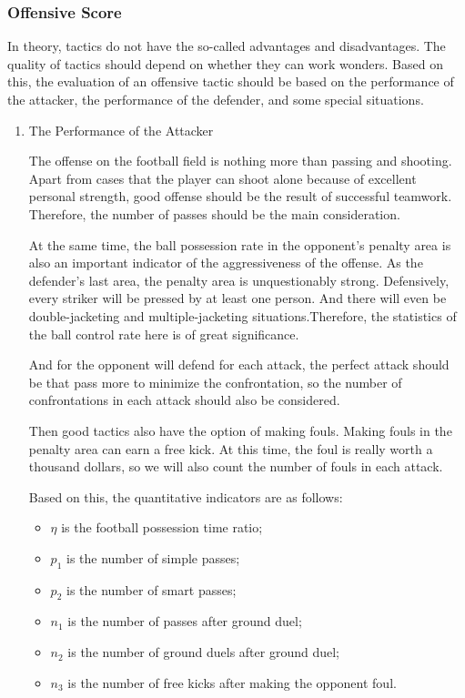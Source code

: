 \documentclass{mcmthesis}
\begin{document}
\subsubsection{Offensive Score}
	In theory, tactics do not have the so-called advantages and disadvantages. The quality of tactics should depend on whether they can work wonders.  Based on this, the evaluation of an offensive tactic should be based on the performance of the attacker, the performance of the defender, and some special situations.
	\begin{enumerate}
	\item The Performance of the Attacker
	
	\qquad The offense on the football field is nothing more than passing and shooting. Apart from cases that the player can shoot alone because of excellent personal strength, good offense should be the result of successful teamwork.  Therefore, the number of passes should be the main consideration.

	\qquad At the same time, the ball possession rate in the opponent's penalty area is also an important indicator of the aggressiveness of the offense. As the defender's last area, the penalty area is unquestionably strong.  Defensively, every striker will be pressed by at least one person.  And there will even be double-jacketing and multiple-jacketing situations.Therefore, the statistics of the ball control rate here is of great significance. 

	\qquad And for the opponent will defend for each attack, the perfect attack should be that pass more to minimize the confrontation, so the number of confrontations in each attack should also be considered.  

	\qquad Then good tactics also have the option of making fouls. Making fouls in the penalty area can earn a free kick. At this time, the foul is really worth a thousand dollars, so we will also count the number of fouls in each attack.
	
	\qquad Based on this, the quantitative indicators are as follows:
	
	\begin{itemize}
		\item $\eta$ is the football possession time ratio;
		\item $p_{1}$ is the number of simple passes;
		\item $p_{2}$ is the number of smart passes;
		\item $n_{1}$ is the number of passes after ground duel;
		\item $n_{2}$ is the number of ground duels after ground duel;
		\item $n_{3}$ is the number of free kicks after making the opponent foul.
	\end{itemize}


\end{enumerate}
\end{document}
